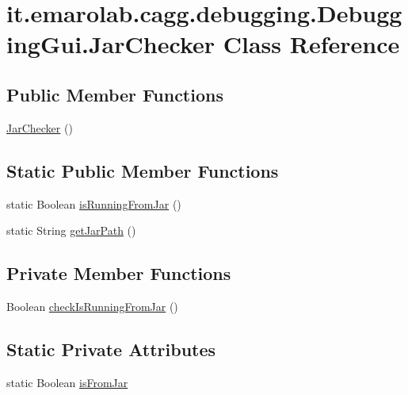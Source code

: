 \hypertarget{classit_1_1emarolab_1_1cagg_1_1debugging_1_1DebuggingGui_1_1JarChecker}{\section{it.\-emarolab.\-cagg.\-debugging.\-Debugging\-Gui.\-Jar\-Checker Class Reference}
\label{classit_1_1emarolab_1_1cagg_1_1debugging_1_1DebuggingGui_1_1JarChecker}
}
\subsection*{Public Member Functions}
\begin{DoxyCompactItemize}
\item 
\hyperlink{classit_1_1emarolab_1_1cagg_1_1debugging_1_1DebuggingGui_1_1JarChecker_a4b34a0974eb421ae2869c5e38e240f0f}{Jar\-Checker} ()
\end{DoxyCompactItemize}
\subsection*{Static Public Member Functions}
\begin{DoxyCompactItemize}
\item 
static Boolean \hyperlink{classit_1_1emarolab_1_1cagg_1_1debugging_1_1DebuggingGui_1_1JarChecker_a1a16f990962e924a409923ed49403557}{is\-Running\-From\-Jar} ()
\item 
static String \hyperlink{classit_1_1emarolab_1_1cagg_1_1debugging_1_1DebuggingGui_1_1JarChecker_a042e08f279404bec66e17e9a49867558}{get\-Jar\-Path} ()
\end{DoxyCompactItemize}
\subsection*{Private Member Functions}
\begin{DoxyCompactItemize}
\item 
Boolean \hyperlink{classit_1_1emarolab_1_1cagg_1_1debugging_1_1DebuggingGui_1_1JarChecker_a946b4313f459c4af09224f541a58ae24}{check\-Is\-Running\-From\-Jar} ()
\end{DoxyCompactItemize}
\subsection*{Static Private Attributes}
\begin{DoxyCompactItemize}
\item 
static Boolean \hyperlink{classit_1_1emarolab_1_1cagg_1_1debugging_1_1DebuggingGui_1_1JarChecker_ac7adb49d7b74ef92721fb70bba67680b}{is\-From\-Jar}
\end{DoxyCompactItemize}


